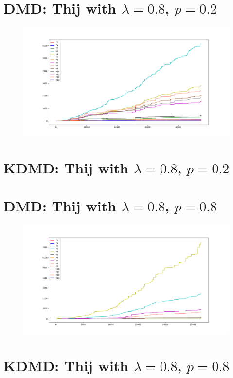 \FloatBarrier

\section{DMD: Thij with $\lambda=0.8$, $p=0.2$}
\begin{figure}
    \includegraphics[width=12cm]{Images/twitter_counts_080209.png}
    \centering
\end{figure}

\section{KDMD: Thij with $\lambda=0.8$, $p=0.2$}



\FloatBarrier

\section{DMD: Thij with $\lambda=0.8$, $p=0.8$}
\begin{figure}
    \includegraphics[width=12cm]{Images/twitter_counts_080809.png}
    \centering
\end{figure}

\section{KDMD: Thij with $\lambda=0.8$, $p=0.8$}



